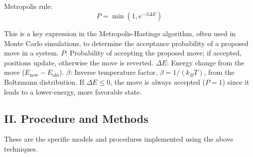 \documentclass[12pt]{article}
\begin{document}
\begin{flushleft}

\vspace{-1em} 
\subsection*{}

Metropolis rule:
\begin{equation}
P = \min\left(1, e^{-\beta \Delta E}\right)
\end{equation}

This is a key expression in the Metropolis-Hastings algorithm, often used in Monte Carlo simulations, to determine the acceptance probability of a proposed move in a system. $P$: Probability of accepting the proposed move; if accepted, positions update, otherwise the move is reverted.
$\Delta E$: Energy change from the move ($E_{\text{new}} - E_{\text{old}}$).
$\beta$: Inverse temperature factor, $\beta = 1 / (k_B T)$, from the Boltzmann distribution. 
If $\Delta E \leq 0$, the move is always accepted ($P = 1$) since it leads to a lower-energy, more favorable state.
 
\vspace{-1em} 
\subsection*{II. Procedure and Methods} 


These are the specific models and procedures implemented using the above techniques.\\

\vspace{-1em} 

  \subsection*{}


\end{flushleft}
\end{document}
